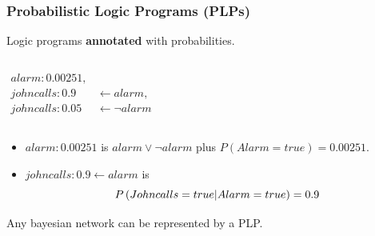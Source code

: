 \documentclass[bigger,xcolor={x11names,svgnames}]{beamer}
\begin{document}
\begin{frame}
    \frametitle{Probabilistic Logic Programs (PLPs)}
    \small

    \vfill
    \begin{center}
        Logic programs \textbf{annotated} with probabilities.
    \end{center}

    \vfill
    \begin{columns}[c]


        $
            \begin{aligned}
                alarm:0.00251, &                       \\
                johncalls:0.9  & \leftarrow alarm,     \\
                johncalls:0.05 & \leftarrow \neg alarm
            \end{aligned}
        $
    \end{columns}

    \vfill
    \begin{itemize}
        \item \alert{$alarm:0.00251$} is $alarm \vee \neg alarm$ plus $P(Alarm = true) = 0.00251$.
        \item \alert{$johncalls:0.9 \leftarrow alarm$} is
              $$P\del{Johncalls = true \middle| Alarm = true} = 0.9$$
    \end{itemize}

    \vfill
    \begin{center}
        Any bayesian network can be represented by a PLP.
    \end{center}
\end{frame}
%
\end{document}
